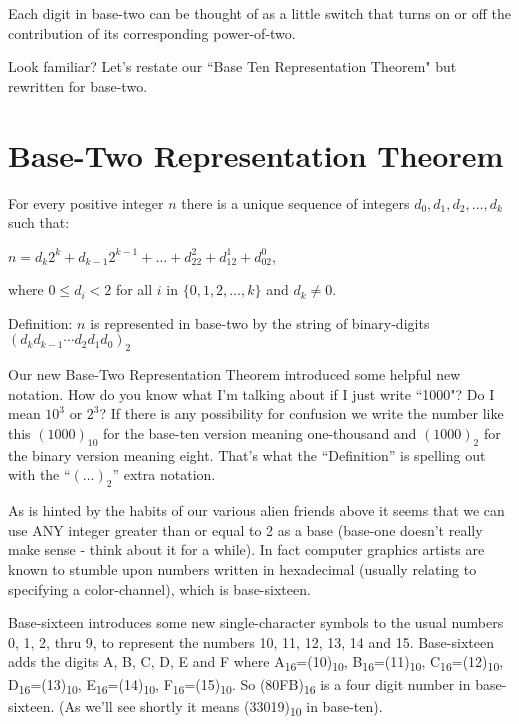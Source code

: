 \documentclass{article}
\newenvironment{jprIn}{\begin{adjustwidth}{2em}{}}{\end{adjustwidth}}
\begin{document}
Each digit in base-two can be thought of as a little switch that
turns on or off the contribution of its corresponding power-of-two.

Look familiar? Let's restate our ``Base Ten Representation Theorem" but rewritten for base-two.

\break
\section*{Base-Two Representation Theorem}
\begin{jprIn}
For every positive integer $n$ there is a unique
sequence of integers $d_0, d_1, d_2,\dots{},d_k$ such that:

\hspace{3em}$n=d_k2^k+d_{k-1}2^{k-1}+\dots+d_22^2+d_12^1+d_02^0$,

where $0\le{}d_i<2$ for all $i$ in $\{0,1,2,\dots{},k\}$ and $d_k\ne0$.

Definition: $n$ is represented in base-two by the string
of binary-digits $(d_kd_{k-1}{\cdots}d_2d_1d_0)_2$
\end{jprIn}
\bigskip

Our new Base-Two Representation Theorem introduced some helpful new notation.
How do you know what I'm talking about if I just
write ``1000"? Do I mean $10^3$ or $2^3$?
If there is any possibility for confusion we write
the number like this $(1000)_{10}$ 
for the base-ten version meaning one-thousand and $(1000)_2$
for the binary version meaning eight.
That's what the ``Definition'' is spelling out with the ``$(\dots)_2$'' extra notation.

As is hinted by the habits of our various alien friends
above it seems that we can use ANY integer greater than
or equal to 2 as a base (base-one doesn't really make
sense - think about it for a while).
In fact computer graphics artists are known
to stumble upon numbers written in hexadecimal (usually relating to specifying a color-channel),
which is base-sixteen.

Base-sixteen introduces some new single-character symbols to the usual numbers 0, 1,
2, thru 9,
to represent the numbers 10, 11, 12, 13, 14 and 15.
Base-sixteen adds the digits A, B, C, D, E and F where
A\textsubscript{16}=(10)\textsubscript{10},
B\textsubscript{16}=(11)\textsubscript{10},
C\textsubscript{16}=(12)\textsubscript{10},
D\textsubscript{16}=(13)\textsubscript{10},
E\textsubscript{16}=(14)\textsubscript{10},
F\textsubscript{16}=(15)\textsubscript{10}.
So (80FB)\textsubscript{16} is a four digit number in base-sixteen.
(As we'll see shortly it means (33019)\textsubscript{10} in base-ten).
\end{document}
